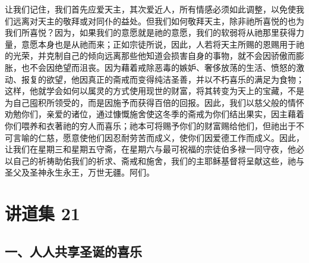 让我们记住，我们首先应爱天主，其次爱近人，所有情感必须如此调整，以免使我们远离对天主的敬拜或对同仆的益处。但我们如何敬拜天主，除非祂所喜悦的也为我们所喜悦？因为，如果我们的意愿就是祂的意愿，我们的软弱将从祂那里获得力量，意愿本身也是从祂而来；正如宗徒所说，因此，人若将天主所赐的恩赐用于祂的光荣，并克制自己的倾向远离那些他知道会损害自身的事物，就不会因骄傲而膨胀，也不会因绝望而沮丧。因为藉着戒除恶毒的嫉妒、奢侈放荡的生活、愤怒的激动、报复的欲望，他因真正的斋戒而变得纯洁圣善，并以不朽喜乐的满足为食物；这样，他就学会如何以属灵的方式使用现世的财富，将其转变为天上的宝藏，不是为自己囤积所领受的，而是因施予而获得百倍的回报。因此，我们以慈父般的情怀劝勉你们，亲爱的诸位，通过慷慨施舍使这冬季的斋戒为你们结出果实，因主藉着你们喂养和衣著祂的穷人而喜乐；祂本可将赐予你们的财富赐给他们，但祂出于不可言喻的仁慈，愿意使他们因忍耐劳苦而成义，使你们因爱德工作而成义。因此，让我们在星期三和星期五守斋，在星期六与最可祝福的宗徒伯多禄一同守夜，他必以自己的祈祷助佑我们的祈求、斋戒和施舍，我们的主耶稣基督将呈献这些，祂与圣父及圣神永生永王，万世无疆。阿们。\par



\section{讲道集 21}

\par


\subsection{一、人人共享圣诞的喜乐}


